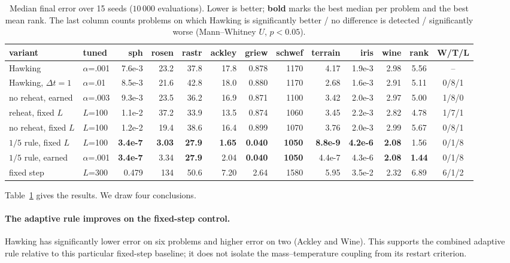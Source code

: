 \documentclass[10pt,a4paper]{article}
\begin{document}
\begin{table}[t]
\centering
\footnotesize
\setlength{\tabcolsep}{3.4pt}
\caption{Median final error over 15 seeds ($10\,000$ evaluations). Lower is better;
\textbf{bold} marks the best median per problem and the best mean rank. The last column counts problems on
which Hawking is significantly better / no difference is detected / significantly worse
(Mann--Whitney $U$, $p<0.05$).}
\label{tab:controls}
\begin{tabular}{@{}llrrrrrrrrrcc@{}}
\toprule
variant & tuned & sph & rosen & rastr & ackley & griew & schwef & terrain & iris & wine & rank & W/T/L \\
\midrule
Hawking                     & $\alpha$=.001 & 7.6e-3 & 23.2 & 37.8 & 17.8 & 0.878 & 1170 & 4.17 & 1.9e-3 & 2.98 & 5.56 & -- \\
Hawking, $\Delta t=1$       & $\alpha$=.01  & 8.5e-3 & 21.6 & 42.8 & 18.0 & 0.880 & 1170 & 2.68 & 1.6e-3 & 2.91 & 5.11 & 0/8/1 \\
no reheat, earned           & $\alpha$=.003 & 9.3e-3 & 23.5 & 36.2 & 16.9 & 0.871 & 1100 & 3.42 & 2.0e-3 & 2.97 & 5.00 & 1/8/0 \\
reheat, fixed $L$           & $L$=100       & 1.1e-2 & 37.2 & 33.9 & 13.5 & 0.874 & 1060 & 3.45 & 2.2e-3 & 2.82 & 4.78 & 1/7/1 \\
no reheat, fixed $L$        & $L$=100       & 1.2e-2 & 19.4 & 38.6 & 16.4 & 0.899 & 1070 & 3.76 & 2.0e-3 & 2.99 & 5.67 & 0/8/1 \\
\midrule
$1/5$ rule, fixed $L$       & $L$=100       & \textbf{3.4e-7} & \textbf{3.03} & \textbf{27.9} & \textbf{1.65} & \textbf{0.040} & \textbf{1050} & \textbf{8.8e-9} & \textbf{4.2e-6} & \textbf{2.08} & 1.56 & 0/1/8 \\
$1/5$ rule, earned          & $\alpha$=.001 & \textbf{3.4e-7} & 3.34 & \textbf{27.9} & 2.04 & \textbf{0.040} & \textbf{1050} & 4.4e-7 & 4.3e-6 & \textbf{2.08} & \textbf{1.44} & 0/1/8 \\
fixed step                  & $L$=300       & 0.479 & 134 & 50.6 & 7.20 & 2.64 & 1580 & 5.95 & 3.5e-2 & 2.32 & 6.89 & 6/1/2 \\
\bottomrule
\end{tabular}
\end{table}

Table~\ref{tab:controls} gives the results. We draw four conclusions.

\paragraph{The adaptive rule improves on the fixed-step control.} Hawking has
significantly lower error on six problems and higher error on two (Ackley and
Wine). This supports the combined adaptive rule relative to this particular
fixed-step baseline; it does not isolate the mass--temperature coupling from
its restart criterion.
\end{document}
